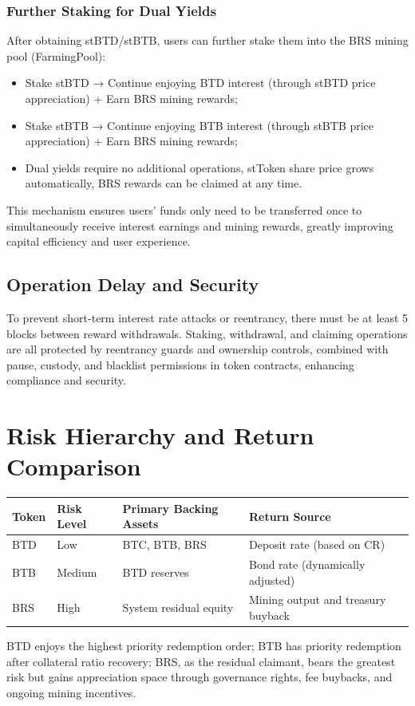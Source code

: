 \documentclass{article}
\begin{document}
\subsubsection{Further Staking for Dual Yields}
After obtaining stBTD/stBTB, users can further stake them into the BRS mining pool (FarmingPool):
\begin{itemize}
  \item Stake stBTD → Continue enjoying BTD interest (through stBTD price appreciation) + Earn BRS mining rewards;
  \item Stake stBTB → Continue enjoying BTB interest (through stBTB price appreciation) + Earn BRS mining rewards;
  \item Dual yields require no additional operations, stToken share price grows automatically, BRS rewards can be claimed at any time.
\end{itemize}

This mechanism ensures users' funds only need to be transferred once to simultaneously receive interest earnings and mining rewards, greatly improving capital efficiency and user experience.

\subsection{Operation Delay and Security}
To prevent short-term interest rate attacks or reentrancy, there must be at least 5 blocks between reward withdrawals. Staking, withdrawal, and claiming operations are all protected by reentrancy guards and ownership controls, combined with pause, custody, and blacklist permissions in token contracts, enhancing compliance and security.

\section{Risk Hierarchy and Return Comparison}
\begin{center}
\begin{tabularx}{\textwidth}{l l l l}
\toprule
Token & Risk Level & Primary Backing Assets & Return Source \\
\midrule
BTD & Low & BTC, BTB, BRS & Deposit rate (based on CR) \\
BTB & Medium & BTD reserves & Bond rate (dynamically adjusted) \\
BRS & High & System residual equity & Mining output and treasury buyback \\
\bottomrule
\end{tabularx}
\end{center}
BTD enjoys the highest priority redemption order; BTB has priority redemption after collateral ratio recovery; BRS, as the residual claimant, bears the greatest risk but gains appreciation space through governance rights, fee buybacks, and ongoing mining incentives.
\end{document}
